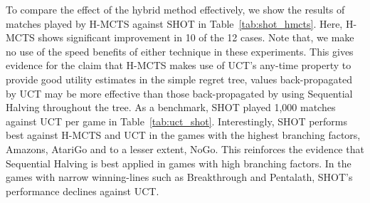 \documentclass[a4paper]{llncs}
\begin{document}
\begin{table}[ht]
\centering
\tabcolsep=0.45cm
\vspace{4mm}
{\caption{SHOT vs. UCT with random play-outs, 1,000 games} \label{tab:uct_shot}}
\end{table}

To compare the effect of the hybrid method effectively, we show the results of matches played by H-MCTS against SHOT in Table~\ref{tab:shot_hmcts}. Here, H-MCTS shows significant improvement in 10 of the 12 cases. Note that, we make no use of the speed benefits of either technique in these experiments. This gives evidence for the claim that H-MCTS makes use of UCT's any-time property to provide good utility estimates in the simple regret tree, values back-propagated by UCT may be more effective than those back-propagated by using Sequential Halving throughout the tree. 
As a benchmark, SHOT played 1,000 matches against UCT per game in Table~\ref{tab:uct_shot}. Interestingly, SHOT performs best against H-MCTS and UCT in the games with the highest branching factors, Amazons, AtariGo and to a lesser extent, NoGo. This reinforces the evidence that Sequential Halving is best applied in games with high branching factors. In the games with narrow winning-lines such as Breakthrough and Pentalath, SHOT's performance declines against UCT.
\end{document}
